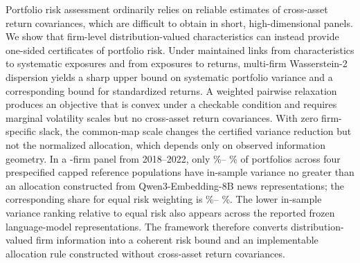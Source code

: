 Portfolio risk assessment ordinarily relies on reliable estimates of
cross-asset return covariances, which are difficult to obtain in short,
high-dimensional panels.
We show that firm-level distribution-valued characteristics can instead provide
one-sided certificates of portfolio risk.
Under maintained links from characteristics to systematic exposures and from
exposures to returns, multi-firm Wasserstein-2 dispersion yields a sharp upper
bound on systematic portfolio variance and a corresponding bound for
standardized returns.
A weighted pairwise relaxation produces an objective that is convex under a
checkable condition and requires marginal volatility scales but no cross-asset
return covariances.
With zero firm-specific slack, the common-map scale changes the certified
variance reduction but not the normalized allocation, which depends only on
observed information geometry.
In a -firm panel from 2018--2022, only
\%--
\% of portfolios across
four prespecified capped reference populations have in-sample variance no
greater than an allocation constructed from Qwen3-Embedding-8B news
representations; the corresponding share for equal risk weighting is
\%--
\%.
The lower in-sample variance ranking relative to equal risk also appears across
the reported frozen language-model representations.
The framework therefore converts distribution-valued firm information into a
coherent risk bound and an implementable allocation rule constructed without
cross-asset return covariances.

